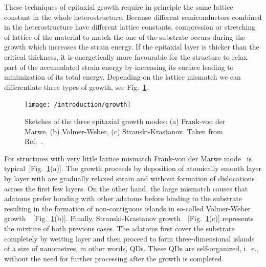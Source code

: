 \documentclass[
a4paper, %
11pt, %
onecolumn, %
openany, %
oldfontcommands,
]{memoir}
\begin{document}
These techniques of epitaxial growth require in principle the same lattice constant in the whole heterostructure. Because different semiconductors combined in the heterostructure have different lattice constants, compression or stretching of lattice of the material to match the one of the substrate occurs during the growth which increases the strain energy. %
% 
If the epitaxial layer is thicker than the critical thickness, it is energetically more favourable for the structure to relax part of the accumulated strain energy by increasing its surface leading to minimization of its total energy.
Depending on the lattice mismatch %
we can differentiate three types of growth, see Fig.~\ref{fig:intr:growth}.
%
\begin{figure}
	\centering
	\texttt{[image: /introduction/growth]}
	\caption{Sketches of the three epitaxial growth modes: (a) Frank-von der Marwe, (b) Volmer-Weber, (c) Stranski-Krastanov. Taken from Ref.~\cite{t_bonato}.}
	\label{fig:intr:growth}
\end{figure}
%

For structures with very little lattice mismatch Frank-von der Marwe mode~\cite{Frank-Merwe} is typical~[Fig.~\ref{fig:intr:growth}(a)]. The growth proceeds by deposition of atomically smooth layer by layer with are gradually relaxed strain and without formation of dislocations across the first few layers. On the other hand, the large mismatch causes that adatoms prefer bonding with other adatoms before binding to the substrate resulting in the formation of non-contiguous islands in so-called Volmer-Weber growth~\cite{Volmer-Weber}~[Fig.~\ref{fig:intr:growth}(b)]. Finally, Stranski-Krastanov growth~\cite{Stranski1937}~[Fig.~\ref{fig:intr:growth}(c)] represents the mixture of both previous cases. The adatoms first cover the substrate completely by wetting layer and then proceed to form three-dimensional islands of a size of nanometres, in other words, QDs. These QDs are self-organized, i.~e., without the need for further processing after the growth is completed.
\end{document}

